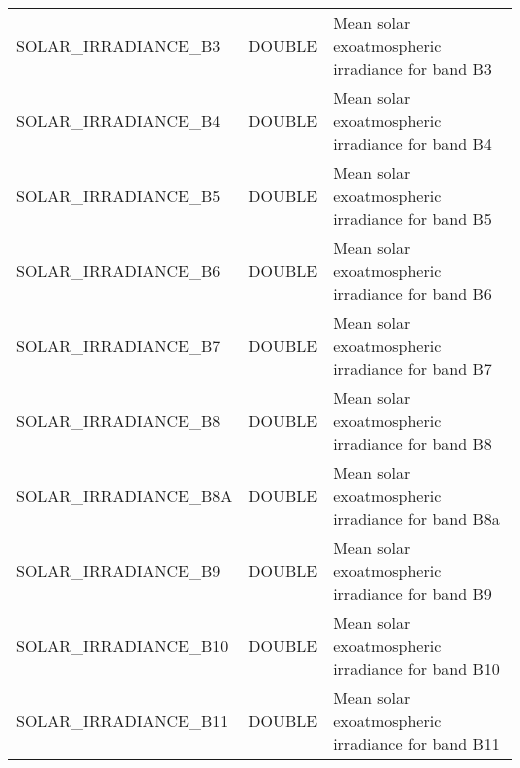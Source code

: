 \documentclass[lettersize,journal]{IEEEtran}
\begin{document}
\begin{table*}[t]
{\begin{tabular}{llp{14cm}}
SOLAR\_IRRADIANCE\_B3                   & DOUBLE                            & Mean solar exoatmospheric irradiance for band B3                                                                                                                     \\
SOLAR\_IRRADIANCE\_B4                   & DOUBLE                            & Mean solar exoatmospheric irradiance for band B4                                                                                                                     \\
SOLAR\_IRRADIANCE\_B5                   & DOUBLE                            & Mean solar exoatmospheric irradiance for band B5                                                                                                                     \\
SOLAR\_IRRADIANCE\_B6                   & DOUBLE                            & Mean solar exoatmospheric irradiance for band B6                                                                                                                     \\
SOLAR\_IRRADIANCE\_B7                   & DOUBLE                            & Mean solar exoatmospheric irradiance for band B7                                                                                                                     \\
SOLAR\_IRRADIANCE\_B8                   & DOUBLE                            & Mean solar exoatmospheric irradiance for band B8                                                                                                                     \\
SOLAR\_IRRADIANCE\_B8A                  & DOUBLE                            & Mean solar exoatmospheric irradiance for band B8a                                                                                                                    \\
SOLAR\_IRRADIANCE\_B9                   & DOUBLE                            & Mean solar exoatmospheric irradiance for band B9                                                                                                                     \\
SOLAR\_IRRADIANCE\_B10                  & DOUBLE                            & Mean solar exoatmospheric irradiance for band B10                                                                                                                    \\
SOLAR\_IRRADIANCE\_B11                  & DOUBLE                            & Mean solar exoatmospheric irradiance for band B11                                                                                                                    \\

\end{tabular}}
\end{table*}
\end{document}
